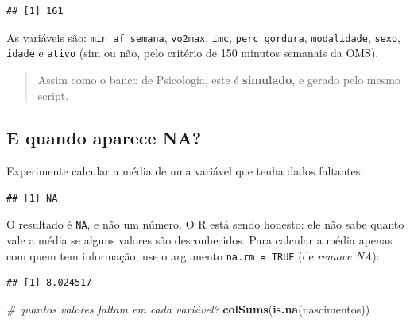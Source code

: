 \documentclass[
]{book}
\newenvironment{Shaded}{\begin{snugshade}}{\end{snugshade}}
\newcommand{\AttributeTok}[1]{\textcolor[rgb]{0.13,0.29,0.53}{#1}}
\newcommand{\CommentTok}[1]{\textcolor[rgb]{0.56,0.35,0.01}{\textit{#1}}}
\newcommand{\ConstantTok}[1]{\textcolor[rgb]{0.56,0.35,0.01}{#1}}
\newcommand{\FunctionTok}[1]{\textcolor[rgb]{0.13,0.29,0.53}{\textbf{#1}}}
\newcommand{\NormalTok}[1]{#1}
\newcommand{\SpecialCharTok}[1]{\textcolor[rgb]{0.81,0.36,0.00}{\textbf{#1}}}
\begin{document}
\begin{verbatim}
## [1] 161
\end{verbatim}

As variáveis são: \texttt{min\_af\_semana}, \texttt{vo2max}, \texttt{imc}, \texttt{perc\_gordura}, \texttt{modalidade}, \texttt{sexo}, \texttt{idade} e \texttt{ativo} (sim ou não, pelo critério de 150 minutos semanais da OMS).

\begin{quote}
Assim como o banco de Psicologia, este é \textbf{simulado}, e gerado pelo mesmo script.
\end{quote}

\subsection{E quando aparece NA?}\label{e-quando-aparece-na}

Experimente calcular a média de uma variável que tenha dados faltantes:

\begin{Shaded}
\end{Shaded}

\begin{verbatim}
## [1] NA
\end{verbatim}

O resultado é \texttt{NA}, e não um número. O R está sendo honesto: ele não sabe quanto vale a média se alguns valores são desconhecidos. Para calcular a média apenas com quem tem informação, use o argumento \texttt{na.rm\ =\ TRUE} (de \emph{remove NA}):

\begin{Shaded}
\end{Shaded}

\begin{verbatim}
## [1] 8.024517
\end{verbatim}

\begin{Shaded}
\begin{Highlighting}[]
\CommentTok{\# quantos valores faltam em cada variável?}
\FunctionTok{colSums}\NormalTok{(}\FunctionTok{is.na}\NormalTok{(nascimentos))}
\end{Highlighting}
\end{Shaded}
\end{document}
